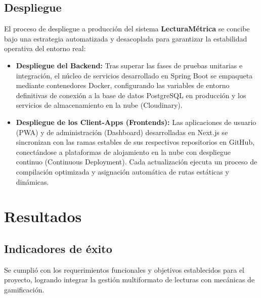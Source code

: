 \documentclass[12pt, atypical, journal]{article}
\begin{document}
\vspace{0.2cm}

\subsection{Despliegue}
El proceso de despliegue a producción del sistema \textbf{LecturaMétrica} se concibe bajo una estrategia automatizada y desacoplada para garantizar la estabilidad operativa del entorno real:
\begin{itemize}
    \item \textbf{Despliegue del Backend:} Tras superar las fases de pruebas unitarias e integración, el núcleo de servicios desarrollado en Spring Boot se empaqueta mediante contenedores Docker, configurando las variables de entorno definitivas de conexión a la base de datos PostgreSQL en producción y los servicios de almacenamiento en la nube (Cloudinary).
    \item \textbf{Despliegue de los Client-Apps (Frontends):} Las aplicaciones de usuario (PWA) y de administración (Dashboard) desarrolladas en Next.js se sincronizan con las ramas estables de sus respectivos repositorios en GitHub, conectándose a plataformas de alojamiento en la nube con despliegue continuo (Continuous Deployment). Cada actualización ejecuta un proceso de compilación optimizada y asignación automática de rutas estáticas y dinámicas.
\end{itemize}
\newpage

\section{Resultados}

\subsection{Indicadores de éxito}
Se cumplió con los requerimientos funcionales y objetivos establecidos para el proyecto, logrando integrar la gestión multiformato de lecturas con mecánicas de gamificación.
\end{document}
